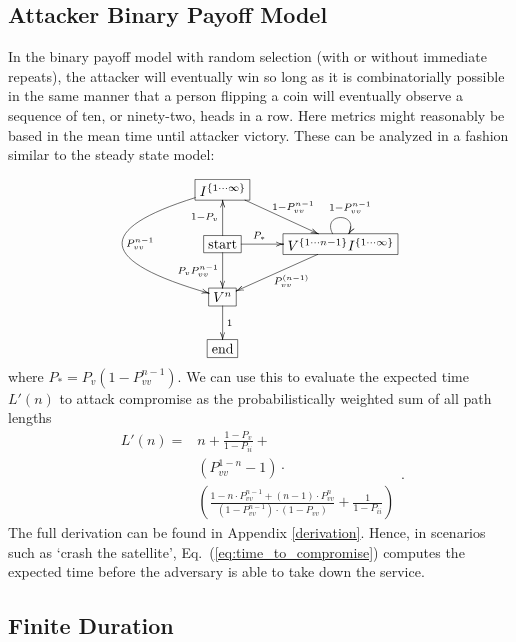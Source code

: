 \documentclass{acm_proc_article-sp}
\begin{document}
\subsection{Attacker Binary Payoff Model}
\label{ABPM}

In the binary payoff model with random selection (with or without immediate
repeats), the attacker will eventually win so long as it is combinatorially
possible in the same manner that a person flipping a coin will eventually
observe a sequence of ten, or ninety-two, heads in a row. Here metrics
might reasonably be based in the mean time until attacker victory.
These can be analyzed in a fashion similar to the steady state model:

\[
\xymatrix{*+[F-]{I^{\left\{ 1\cdots\infty\right\} }}\ar[dr]^{1-P_{vv}^{n-1}}\ar@/_{6pc}/[dd]^{P_{vv}^{n-1}}\\
*+[F-]{\text{start}}\ar[r]^{\negthickspace\negthickspace\negthickspace\negthickspace\negthickspace\negthickspace\negthickspace\negthickspace\negthickspace\negthickspace\negthickspace\negthickspace\negthickspace\negthickspace P_{*}}\ar[d]_{\footnotesize{P_{v}P_{vv}^{n-1}}}\ar[u]^{1-P_{v}} & *+[F-]{V^{\left\{ 1\cdots n-1\right\} }I^{\left\{ 1\cdots\infty\right\} }}\ar[dl]^{P_{vv}^{(n-1)}}\ar@(ul,ur)[]^{\;\;\;\;\;\;1-P_{vv}^{n-1}}\\
*+[F-]{V^{n}}\ar[d]^{1}\\
*+[F-]{\text{end}}
}
\]
where $P_{*}=P_{v}\left(1-P_{vv}^{n-1}\right)$.  We can use this to evaluate the expected time $L'(n)$ to attack compromise
as the probabilistically weighted sum of all path lengths
\begin{equation}
\begin{split}
L'(n)=&n+\frac{1-P_{v}}{1-P_{ii}}+\\
	&\left(P_{vv}^{1-n}-1\right)\cdot\\
        &\left(\frac{1-n\cdot P_{vv}^{n-1}+\left(n-1\right)\cdot P_{vv}^{n}}{\left(1-P_{vv}^{n-1}\right)\cdot\left(1-P_{vv}\right)}+\frac{1}{1-P_{ii}}\right)
\end{split}
.
\label{eq:time_to_compromise}
\end{equation}
The full derivation can be found in Appendix \ref{derivation}. Hence, in scenarios such as `crash the satellite', Eq.~(\ref{eq:time_to_compromise}) computes the expected time before the adversary is able to take down the service.

\subsection{Finite Duration}
\label{fd}
\end{document}
